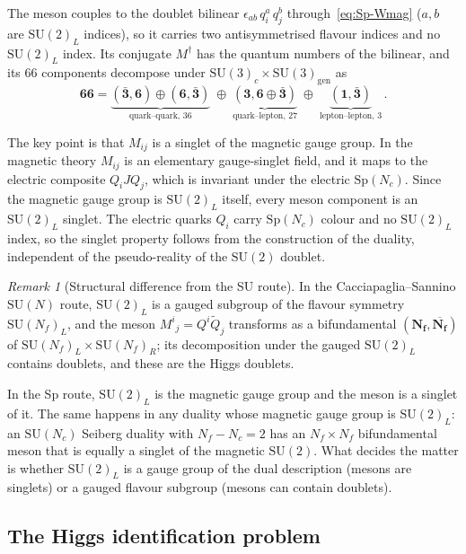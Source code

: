 \documentclass[11pt,a4paper]{article}
\theoremstyle{plain}
\theoremstyle{definition}
\theoremstyle{remark}
\newtheorem{remark}[theorem]{Remark}
\newcommand{\Nc}{N_{\!c}}
\newcommand{\Nf}{N_{\!f}}
\newcommand{\SU}[1]{\mathrm{SU}(#1)}
\newcommand{\Sp}[1]{\mathrm{Sp}(#1)}
\begin{document}
The meson couples to the doublet bilinear
$\epsilon_{ab}\, q_i^a\, q_j^b$ through~\eqref{eq:Sp-Wmag} ($a, b$ are
$\SU{2}_L$ indices), so it carries two antisymmetrised flavour indices
and no $\SU{2}_L$ index.  Its conjugate $M^\dagger$ has the quantum
numbers of the bilinear, and its 66 components decompose under
$\SU{3}_c \times \SU{3}_{\mathrm{gen}}$ as
\begin{equation}\label{eq:meson-decomp}
  \mathbf{66} =
  \underbrace{(\bar{\mathbf{3}}, \mathbf{6})
  \oplus (\mathbf{6}, \bar{\mathbf{3}})}_{\text{quark--quark, } 36}
  \;\oplus\;
  \underbrace{(\mathbf{3}, \mathbf{6} \oplus \bar{\mathbf{3}})}_{
  \text{quark--lepton, } 27}
  \;\oplus\;
  \underbrace{(\mathbf{1}, \bar{\mathbf{3}})}_{\text{lepton--lepton, } 3}\,.
\end{equation}

The key point is that $M_{ij}$ is a singlet of the magnetic gauge
group.  In the magnetic theory $M_{ij}$ is an elementary gauge-singlet
field, and it maps to the electric composite $Q_i J Q_j$, which is
invariant under the electric $\Sp{\Nc}$.  Since the magnetic gauge group
is $\SU{2}_L$ itself, every meson component is an $\SU{2}_L$ singlet.
The electric quarks $Q_i$ carry $\Sp{\Nc}$ colour and no $\SU{2}_L$
index, so the singlet property follows from the construction of the
duality, independent of the pseudo-reality of the $\SU{2}$ doublet.

\begin{remark}[Structural difference from the SU route]
\label{rem:singlet}
In the Cacciapaglia--Sannino $\SU{N}$ route, $\SU{2}_L$ is a gauged
subgroup of the flavour symmetry $\SU{\Nf}_L$, and the meson
$M^i{}_j = Q^i\widetilde{Q}_j$ transforms as a bifundamental
$(\mathbf{\Nf}, \overline{\mathbf{\Nf}})$ of
$\SU{\Nf}_L \times \SU{\Nf}_R$; its decomposition under the gauged
$\SU{2}_L$ contains doublets, and these are the Higgs doublets.

In the Sp route, $\SU{2}_L$ is the magnetic gauge group and the meson is
a singlet of it.  The same happens in any duality whose magnetic gauge
group is $\SU{2}_L$: an $\SU{\Nc}$ Seiberg duality with $\Nf - \Nc = 2$
has an $\Nf \times \Nf$ bifundamental meson that is equally a singlet of
the magnetic $\SU{2}$.  What decides the matter is whether $\SU{2}_L$ is
a gauge group of the dual description (mesons are singlets) or a gauged
flavour subgroup (mesons can contain doublets).
\end{remark}

\subsection{The Higgs identification problem}
\label{ssec:higgs-problem}
\end{document}
